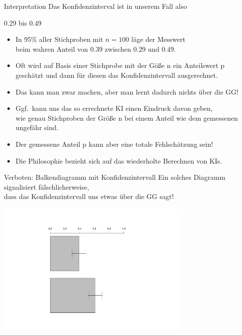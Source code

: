 \begin{frame}
  {Interpretation}
  Das \alert{Konfidenzinterval} ist in unserem Fall also\\
  \vspace{.1cm}
  \begin{center}
    \alert{0.29 bis 0.49}  
  \end{center}
  \pause
  \begin{itemize}[<+->]
    \item In 95\% aller Stichproben mit $n=100$ läge der Messwert\\
      beim wahren Anteil von $0.39$ zwischen $0.29$ und $0.49$.
    \item Oft wird auf Basis einer Stichprobe mit der Göße n ein Anteilswert p\\
      geschätzt und dann für diesen das Konfidenzintervall ausgerechnet.
    \item Das kann man zwar machen, aber man lernt dadurch nichts über die GG!
    \item Ggf.\ kann uns das so errechnete KI einen Eindruck davon geben,\\
      wie genau Stichproben der Größe n bei einem Anteil wie dem gemessenen\\
      ungefähr sind.
      \vspace{\baselineskip}
    \item \alert{Der gemessene Anteil p kann aber eine totale Fehlschätzung sein!}
    \item Die Philosophie bezieht sich auf das \alert{wiederholte Berechnen} von KIs.
  \end{itemize}
\end{frame}

\begin{frame}
  {Verboten: Balkendiagramm mit Konfidenzintervall}
  Ein solches Diagramm signalisiert \alert{fälschlicherweise},\\
  dass das Konfidenzintervall uns etwas über die GG sagt!\\
  \vspace{-1cm}
  \begin{center}
    \includegraphics[width=0.7\textwidth,angle=90]{graphics/ki}
  \end{center}
\end{frame}

